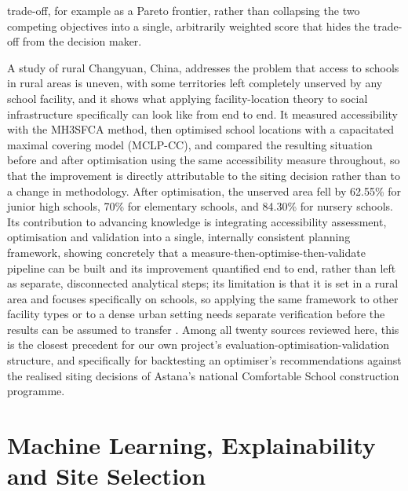 \documentclass[journal]{IEEEtran}
\begin{document}
trade-off, for example as a Pareto frontier, rather than collapsing the two competing objectives into a single, arbitrarily weighted score that hides the trade-off from the decision maker.

A study of rural Changyuan, China, addresses the problem that access to schools in rural areas is uneven, with some territories left completely unserved by any school facility, and it shows what applying facility-location theory to social infrastructure specifically can look like from end to end. It measured accessibility with the MH3SFCA method, then optimised school locations with a capacitated maximal covering model (MCLP-CC), and compared the resulting situation before and after optimisation using the same accessibility measure throughout, so that the improvement is directly attributable to the siting decision rather than to a change in methodology. After optimisation, the unserved area fell by 62.55\% for junior high schools, 70\% for elementary schools, and 84.30\% for nursery schools. Its contribution to advancing knowledge is integrating accessibility assessment, optimisation and validation into a single, internally consistent planning framework, showing concretely that a measure-then-optimise-then-validate pipeline can be built and its improvement quantified end to end, rather than left as separate, disconnected analytical steps; its limitation is that it is set in a rural area and focuses specifically on schools, so applying the same framework to other facility types or to a dense urban setting needs separate verification before the results can be assumed to transfer \cite{han2023education}. Among all twenty sources reviewed here, this is the closest precedent for our own project's evaluation-optimisation-validation structure, and specifically for backtesting an optimiser's recommendations against the realised siting decisions of Astana's national Comfortable School construction programme.

\section{Machine Learning, Explainability and Site Selection}
\label{sec:ml}
\end{document}
